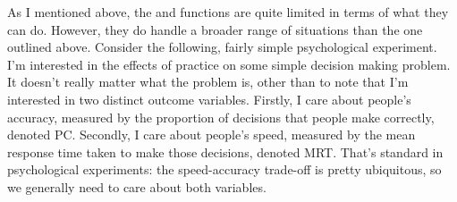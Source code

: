 
As I mentioned above, the  and  functions are quite limited in terms of what they can do. However, they do handle a broader range of situations than the one outlined above. Consider the following, fairly simple psychological experiment. I'm interested in the effects of practice on some simple decision making problem. It doesn't really matter what the problem is, other than to note that I'm interested in two distinct outcome variables. Firstly, I care about people's accuracy, measured by the proportion of decisions that people make correctly, denoted PC. Secondly, I care about people's speed, measured by the mean response time taken to make those decisions, denoted MRT. That's standard in psychological experiments: the speed-accuracy trade-off is pretty ubiquitous, so we generally need to care about both variables.

